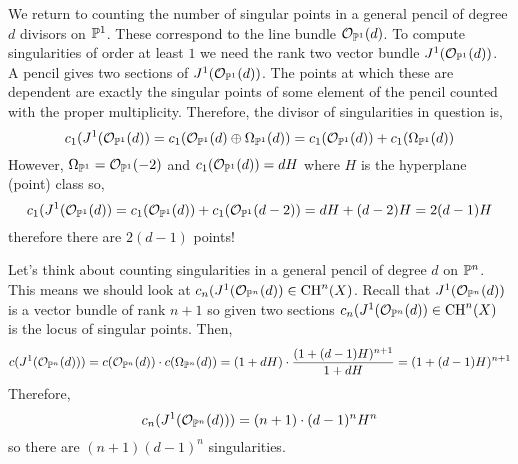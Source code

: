 \documentclass[12pt]{article}
\begin{document}
\begin{example}
We return to counting the number of singular points in a general pencil of degree $d$ divisors on $\P^1$. These correspond to the line bundle $\struct{\P^1}(d)$. To compute singularities of order at least $1$ we need the rank two vector bundle $J^1(\struct{\P^1}(d))$. A pencil gives two sections of $J^1(\struct{\P^1}(d))$. The points at which these are dependent are exactly the singular points of some element of the pencil counted with the proper multiplicity. Therefore, the divisor of singularities in question is,
\[ c_1(J^1(\struct{\P^1}(d)) = c_1(\struct{\P^1}(d) \oplus \Omega_{\P^1}(d)) = c_1(\struct{\P^1}(d)) + c_1(\Omega_{\P^1}(d)) \]
However, $\Omega_{\P^1} = \struct{\P^1}(-2)$ and $c_1(\struct{\P^1}(d)) = d H$ where $H$ is the hyperplane (point) class so,
\[ c_1(J^1(\struct{\P^1}(d)) = c_1(\struct{\P^1}(d)) + c_1(\struct{\P^1}(d-2)) = d H + (d - 2) H = 2 (d - 1) H \]
therefore there are $2 (d - 1)$ points!
\end{example}

\begin{example}
Let's think about counting singularities in a general pencil of degree $d$ on $\P^n$. This means we should look at $c_{n}(J^1(\struct{\P^n}(d)) \in \CH^n(X)$. Recall that $J^1(\struct{\P^n}(d))$ is a vector bundle of rank $n + 1$ so given two sections $c_{n}(J^1(\struct{\P^n}(d)) \in \CH^n(X)$ is the locus of singular points. Then,
\[ c(J^1(\struct{\P^n}(d))) = c(\struct{\P^n}(d)) \cdot c(\Omega_{\P^n}(d)) = (1 + d H) \cdot \frac{(1 + (d - 1) H)^{n+1}}{1 + d H} = (1 + (d-1) H)^{n+1} \]
Therefore,
\[ c_n(J^1(\struct{\P^n}(d))) = (n+1) \cdot (d-1)^n H^n \]
so there are $(n + 1)(d - 1)^n$ singularities. 
\end{example}
\end{document}
